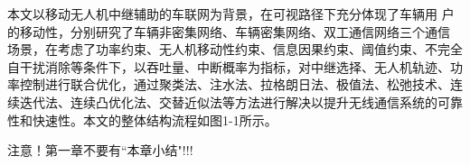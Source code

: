 本文以移动无人机中继辅助的车联网为背景，在可视路径下充分体现了车辆用
户的移动性，分别研究了车辆非密集网络、车辆密集网络、双工通信网络三个通信
场景，在考虑了功率约束、无人机移动性约束、信息因果约束、阈值约束、不完全
自干扰消除等条件下，以吞吐量、中断概率为指标，对中继选择、无人机轨迹、功
率控制进行联合优化，通过聚类法、注水法、拉格朗日法、极值法、松弛技术、连
续迭代法、连续凸优化法、交替近似法等方法进行解决以提升无线通信系统的可靠
性和快速性。本文的整体结构流程如图1-1所示。 
\begin{comment}
\begin{verbatim}
以下是解决pdf文件复制乱码问题（方便论文查重，我已经按照第一种办法做了，如果有个别同学还是不成功，请按照后边方法，照做一下）！！！下面是另外两种办法，共三种办法！！！
(1) 在YSUthesis.cls的Line142，加上``\setCJKmainfont{新宋体}第一种办法！''
%%上面一行是解决pdf文件复制乱码问题！！！下面是另外两种办法，共三种办法！

(2) 在template.tex文件的前边，加上
``\usepackage{ccmap}删掉前边的注释！为了解决论文查重，PDF文件复制出现乱码问题，请去掉这行前面的注释，编译完成后，使用Adobe Acrobat 删掉论文前面多余的两页即可！！！不知道是什么原因，但是这样可以解决问题，有待大家找到更好的解决办法！！！这种方法在编译过程中会终止，需要回车一下！！！''

(3) 在template.tex文件的\classification{O226}前边，加上
``为了解决论文查重，PDF文件复制出现乱码问题，请去掉这行前面的注释，编译完成后，使用Adobe Acrobat 删掉论文前面多余的两页即可！！！不知道是什么原因，但是这样可以解决问题，有待大家找到更好的解决办法！！！''
\end{verbatim}
\end{comment}


注意！第一章不要有``本章小结"!!!
